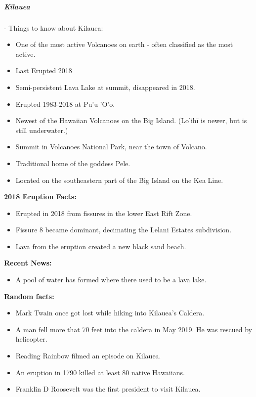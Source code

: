 					\subparagraph{Kilauea} - Things to know about Kilauea: 
						\begin{itemize}
							\item One of the most active Volcanoes on earth - often classified as the most active.
							\item Last Erupted 2018
							\item Semi-persistent Lava Lake at summit, disappeared in 2018.
							\item Erupted 1983-2018 at Pu'u 'O'o.
							\item Newest of the Hawaiian Volcanoes on the Big Island. (Lo'ih\=i is newer, but is still underwater.)
							\item Summit in Volcanoes National Park, near the town of Volcano.
							\item Traditional home of the goddess Pele.
							\item Located on the southeastern part of the Big Island on the Kea Line.
						\end{itemize}
						\textbf{2018 Eruption Facts: }
						\begin{itemize}
							\item Erupted in 2018 from fissures in the lower East Rift Zone. 
							\item Fissure 8 became dominant, decimating the Lelani Estates subdivision.
							\item Lava from the eruption created a new black sand beach. 
						\end{itemize}
						
						\textbf{Recent News: }
						\begin{itemize}
							\item A pool of water has formed where there used to be a lava lake. 
						\end{itemize}
						
						
						\textbf{Random facts:}
						\begin{itemize}
							\item Mark Twain once got lost while hiking into Kilauea's Caldera. 
							\item A man fell more that 70 feet into the caldera in May 2019.  He was rescued by helicopter. 
							\item Reading Rainbow filmed an episode on Kilauea.
							\item An eruption in 1790 killed at least 80 native Hawaiians. 
							\item Franklin D Roosevelt was the first president to visit Kilauea.
						\end{itemize}
				
